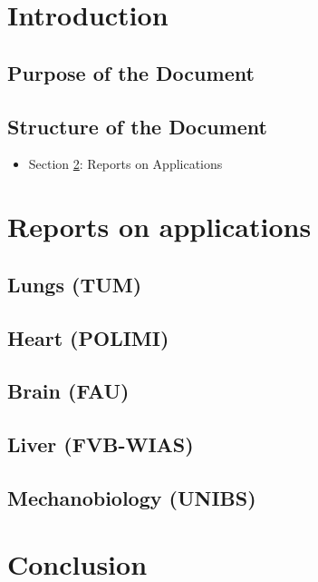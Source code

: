 \documentclass[a4paper,12pt]{article}
\begin{document}
\newpage

\tableofcontents %

\newpage

\section{{Introduction}}

\subsection{{Purpose of the Document}}

\subsection{{Structure of the Document}}
\begin{itemize}
    \item Section \ref{sec:section2}: Reports on Applications
\end{itemize}

\newpage

\section{{Reports on applications}}
\label{sec:section2}

\subsection{Lungs (TUM)}

\subsection{Heart (POLIMI)}

\subsection{Brain (FAU)}

\subsection{Liver (FVB-WIAS)}

\subsection{Mechanobiology (UNIBS)}

\newpage

\section{{Conclusion}} \label{sec:conclusion}

\label{MyLastPage}
\end{document}
